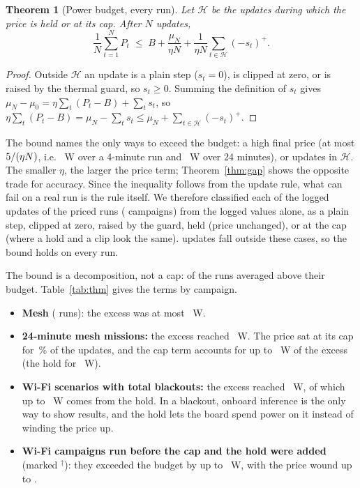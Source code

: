 \documentclass[conference]{IEEEtran}
\newtheorem{theorem}{Theorem}
\begin{document}
\begin{theorem}[Power budget, every run]\label{thm:power}
Let $\mathcal H$ be the updates during which the price is held or at its cap. After $N$ updates,
\begin{equation*}
\frac1N\sum_{t=1}^{N} P_t \;\le\; B + \frac{\mu_N}{\eta N} + \frac{1}{\eta N}\sum_{t\in\mathcal H}(-s_t)^+ .
\end{equation*}
\end{theorem}
\begin{proof}
Outside $\mathcal H$ an update is a plain step ($s_t = 0$), is clipped at zero, or is raised by the thermal guard, so
$s_t \ge 0$. Summing the definition of $s_t$ gives $\mu_N - \mu_0 = \eta\sum_t (P_t - B) + \sum_t s_t$, so
$\eta\sum_t(P_t - B) = \mu_N - \sum_t s_t \le \mu_N + \sum_{t\in\mathcal H}(-s_t)^+$.
\end{proof}
The bound names the only ways to exceed the budget: a high final price (at most $5/(\eta N)$, i.e.
\ThmMarginFour~W over a 4-minute run and \ThmMarginLong~W over 24 minutes), or updates in $\mathcal H$. The smaller
$\eta$, the larger the price term; Theorem~\ref{thm:gap} shows the opposite trade for accuracy. Since the inequality
follows from the update rule, what can fail on a real run is the rule itself. We therefore classified each of the
\ThmUpdates{} logged updates of the \ThmRuns{} priced runs (\ThmCamps{} campaigns) from the logged values alone, as a
plain step, clipped at zero, raised by the guard, held (price unchanged), or at the cap (where a hold and a clip look
the same). \ThmUnexplained{} updates fall outside these cases, so the bound holds on every run.

The bound is a decomposition, not a cap: \ThmOverRuns{} of the \ThmRuns{} runs averaged above their budget.
Table~\ref{tab:thm} gives the terms by campaign.
\begin{itemize}
\item \textbf{Mesh} (\ThmMeshRuns{} runs): the excess was at most \ThmMeshExcess~W.
\item \textbf{24-minute mesh missions:} the excess reached \ThmLongExcess~W. The price sat at its cap for
\ThmLongCapPct\,\% of the updates, and the cap term accounts for up to \ThmLongCapW~W of the excess (the hold for
\ThmLongHoldW~W).
\item \textbf{Wi-Fi scenarios with total blackouts:} the excess reached \ThmWifiHoldExcess~W, of which up to
\ThmWifiHoldW~W comes from the hold. In a blackout, onboard inference is the only way to show results, and the hold
lets the board spend power on it instead of winding the price up.
\item \textbf{Wi-Fi campaigns run before the cap and the hold were added} (marked $^\dagger$): they exceeded the budget
by up to \ThmOldExcess~W, with the price wound up to \ThmOldMu.
\end{itemize}
\end{document}
